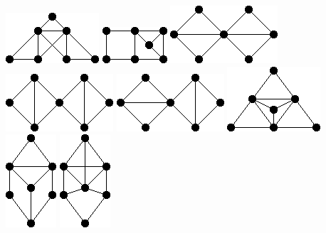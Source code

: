 \documentclass[11pt,paper=b5,footinclude,headinclude]{scrbook} %
\begin{document}
{\includegraphics[scale=0.5,frame]{smallGraphs/g_X1.png}     
\includegraphics[scale=0.5,frame]{smallGraphs/g_X10.png}     
\includegraphics[scale=0.5,frame]{smallGraphs/g_X100.png}     
\includegraphics[scale=0.5,frame]{smallGraphs/g_X101.png}     
\includegraphics[scale=0.5,frame]{smallGraphs/g_X102.png}     
\includegraphics[scale=0.5,frame]{smallGraphs/g_X103.png}     
\includegraphics[scale=0.5,frame]{smallGraphs/g_X104.png}     
\includegraphics[scale=0.5,frame]{smallGraphs/g_X105.png}     
}
\end{document}
